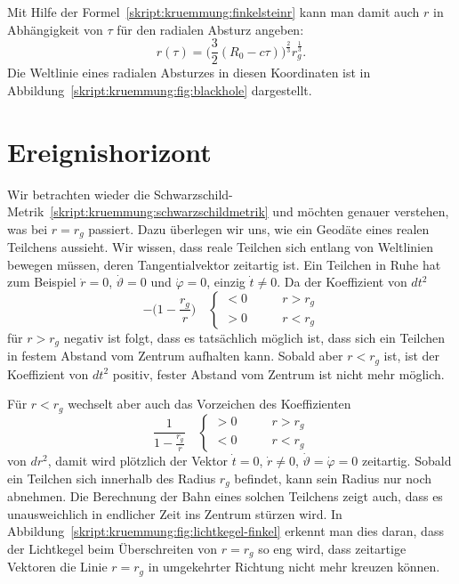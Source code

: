 Mit Hilfe der Formel~\eqref{skript:kruemmung:finkelsteinr}
kann man damit auch $r$ in Abhängigkeit von $\tau$ für den radialen Absturz
angeben:
\[
r(\tau)=\biggl(\frac32(R_0-c\tau)\biggr)^{\frac23}r_g^{\frac13}.
\]
Die Weltlinie eines radialen Absturzes in diesen Koordinaten ist in
Abbildung~\ref{skript:kruemmung:fig:blackhole} dargestellt.

\section{Ereignishorizont%
\label{skript:section:ereignishorizont}}
Wir betrachten wieder die
Schwarzschild-Metrik~\eqref{skript:kruemmung:schwarzschildmetrik}
und möchten genauer verstehen, was bei $r=r_g$ passiert.
Dazu überlegen wir uns, wie ein Geodäte eines realen Teilchens 
aussieht.
Wir wissen, dass reale Teilchen sich entlang von Weltlinien bewegen müssen,
deren Tangentialvektor zeitartig ist.
Ein Teilchen in Ruhe hat zum Beispiel $\dot r=0$, $\dot \vartheta=0$ und
$\dot\varphi=0$, einzig $\dot t\ne 0$.
Da der Koeffizient von $dt^2$
\[
-\biggl(1-\frac{r_g}{r}\biggr)
\quad
\begin{cases}
<0&\qquad r > r_g
\\
>0&\qquad r < r_g
\end{cases}
\]
für $r>r_g$
negativ ist folgt, dass es tatsächlich möglich ist, dass sich ein Teilchen
in festem Abstand vom Zentrum aufhalten kann.
Sobald aber $r<r_g$ ist, ist der Koeffizient von $dt^2$ positiv,
fester Abstand vom Zentrum ist nicht mehr möglich.

Für $r<r_g$ wechselt aber auch das Vorzeichen des Koeffizienten
\[
\frac1{\displaystyle1-\frac{r_g}{r}}
\quad
\begin{cases}
>0&\qquad r>r_g
\\
<0&\qquad r<r_g
\end{cases}
\]
von $dr^2$, damit wird plötzlich der Vektor $\dot t=0$, $\dot r\ne 0$,
$\dot\vartheta=\dot\varphi=0$ zeitartig.
Sobald ein Teilchen sich innerhalb des Radius $r_g$ befindet, kann
sein Radius nur noch abnehmen.
Die Berechnung der Bahn eines solchen Teilchens zeigt auch, dass
es unausweichlich in endlicher Zeit ins Zentrum stürzen wird.
In Abbildung~\ref{skript:kruemmung:fig:lichtkegel-finkel} erkennt 
man dies daran, dass der Lichtkegel beim Überschreiten von $r=r_g$
so eng wird, dass zeitartige Vektoren die Linie $r=r_g$ in umgekehrter
Richtung nicht mehr kreuzen können.

